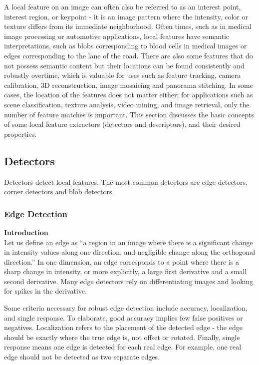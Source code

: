 \documentclass[twoside]{article}
\begin{document}
A local feature on an image can often also be referred to as an interest point, interest region, or keypoint - it is an image pattern where the intensity, color or texture differs from its immediate neighborhood. Often times, such as in medical image processing or automotive applications, local features have semantic interpretations, such as blobs corresponding to blood cells in medical images or edges corresponding to the lane of the road. There are also some features that do not possess semantic content but their locations can be found consistently and robustly overtime, which is valuable for uses such as feature tracking, camera calibration, 3D reconstruction, image mosaicing and panorama stitching. In some cases, the location of the features does not matter either; for applications such as scene classification, texture analysis, video mining, and image retrieval, only the number of feature matches is important. This section discusses the basic concepts of some local feature extractors (detectors and descriptors), and their desired properties. 

\subsection{Detectors}
Detectors detect local features. The most common detectors are edge detectors, corner detectors and blob detectors.
\subsubsection{Edge Detection}
\textbf{Introduction}\\
Let us define an edge as ``a region in an image where there is a significant change in intensity values along one direction, and negligible change along the orthogonal direction.'' In one dimension, an edge corresponds to a point where there is a sharp change in intensity, or more explicitly, a large first derivative and a small second derivative. Many edge detectors rely on differentiating images and looking for spikes in the derivative. 

Some criteria necessary for robust edge detection include accuracy, localization, and single response. To elaborate, good accuracy implies few false positives or negatives.  Localization refers to the placement of the detected edge - the edge should be exactly where the true edge is, not offset or rotated. Finally, single response means one edge is detected for each real edge. For example, one real edge should not be detected as two separate edges. 
\end{document}
